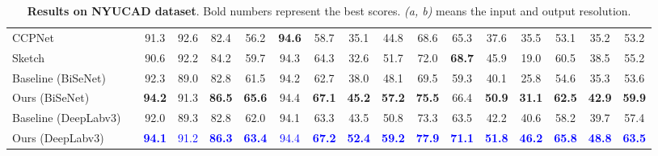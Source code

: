 \documentclass[final]{cvpr}
\begin{document}
\begin{table*}[ht]
\begin{center}
{\begin{tabular}{|l| c |c c c|c c c c c c c c c c c | c|}
CCPNet~\cite{zhang2019cascaded-ccpnet} &  & 91.3 & 92.6 & 82.4 & 56.2 & \textbf{94.6} & 58.7 & 35.1 & 44.8 & 68.6 & 65.3 & 37.6 & 35.5 & 53.1 & 35.2 & 53.2 \\
Sketch~\cite{Chen_2020_SketchAwareSSC} &  & 90.6 & 92.2 & 84.2 & 59.7 & 94.3 & 64.3 & 32.6 & 51.7 & 72.0 & \textbf{68.7} & 45.9 & 19.0 & 60.5 & 38.5 &  55.2 \\ 
\hline
\hline
Baseline (BiSeNet) &  & 
92.3&	89.0&   82.8 &61.5&	94.2&	62.7&	38.0&	48.1&	69.5&	59.3&	40.1&	25.8&	54.6&	35.3&	53.6\\
Ours (BiSeNet) &  & 
\textbf{94.2}&	91.3&	\textbf{86.5}&	\textbf{65.6}&	94.4&	\textbf{67.1}&	\textbf{45.2}&	\textbf{57.2}&	\textbf{75.5}&	66.4&	\textbf{50.9}&	\textbf{31.1}&	\textbf{62.5}&	\textbf{42.9}&	\textbf{59.9}\\
\hline
Baseline (DeepLabv3) &  & 92.0&	89.3&	82.8 &62.0&	94.1&	63.3&	43.5&	50.8&	73.3&	63.5&	42.2&	40.6&	58.2&	39.7&	57.4\\
Ours (DeepLabv3) &  & 
\textcolor{blue}{\textbf{94.1}}& \textcolor{blue}{91.2}& \textcolor{blue}{\textbf{86.3}} & \textcolor{blue}{\textbf{63.4}}& \textcolor{blue}{94.4}& \textcolor{blue}{\textbf{67.2}}& \textcolor{blue}{\textbf{52.4}}& \textcolor{blue}{\textbf{59.2}}& \textcolor{blue}{\textbf{77.9}}& \textcolor{blue}{\textbf{71.1}}& \textcolor{blue}{\textbf{51.8}}& \textcolor{blue}{\textbf{46.2}}& \textcolor{blue}{\textbf{65.8}}& \textcolor{blue}{\textbf{48.8}}& \textcolor{blue}{\textbf{63.5}}\\
\hline
\end{tabular}
}
\end{center}
\vspace{-0.2cm}
\caption{\textbf{Results on NYUCAD dataset}. Bold numbers represent the best scores. \textit{(a, b)} means the input and output resolution.}
\label{tab:SotaOnNYUCAD}
\vspace{-0.3cm}
\end{table*} \begin{table*}[t!]
\begin{center}
\end{center}
\end{table*}
\end{document}
